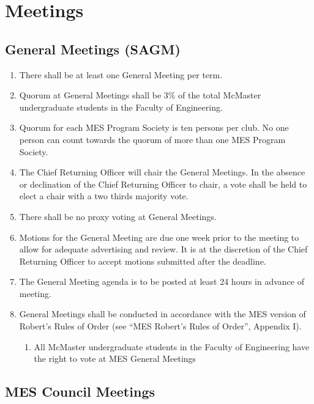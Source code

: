 \section{Meetings}
\label{meetings}

\subsection{General Meetings (SAGM)}
\label{general-meetings-sagm}
\begin{enumerate}
 \item
  There shall be at least one General Meeting per term.
 \item
  Quorum at General Meetings shall be 3\% of the total McMaster
  undergraduate students in the Faculty of Engineering.
 \item
  Quorum for each MES Program Society is ten persons per club. No one
  person can count towards the quorum of more than one MES Program
  Society.
 \item
  The Chief Returning Officer will chair the General Meetings. In the
  absence or declination of the Chief Returning Officer to chair, a vote
  shall be held to elect a chair with a two thirds majority vote.
 \item
  There shall be no proxy voting at General Meetings.
 \item
  Motions for the General Meeting are due one week prior to the meeting
  to allow for adequate advertising and review. It is at the discretion
  of the Chief Returning Officer to accept motions submitted after the
  deadline.
 \item
  The General Meeting agenda is to be posted at least 24 hours in
  advance of meeting.
 \item
  General Meetings shall be conducted in accordance with the MES version
  of Robert's Rules of Order (see ``MES Robert's Rules of Order'',
  Appendix I).

  \begin{enumerate}
   \item
    All McMaster undergraduate students in the Faculty of Engineering
    have the right to vote at MES General Meetings
  \end{enumerate}
\end{enumerate}

\subsection{MES Council Meetings}
\label{mes-council-meetings}

